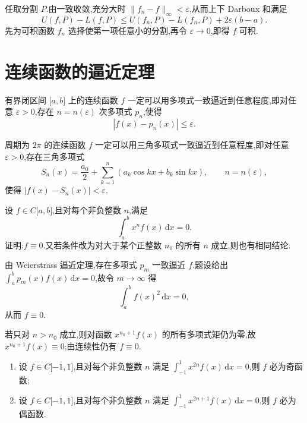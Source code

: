 \begin{solution}
    任取分割 $P$.由一致收敛,充分大时 $\|f_n-f\|_\infty<\varepsilon$,从而上下 Darboux 和满足
    \[
        U(f,P)-L(f,P)
        \leq U(f_n,P)-L(f_n,P)+2\varepsilon(b-a).
    \]
    先为可积函数 $f_n$ 选择使第一项任意小的分割,再令 $\varepsilon\to0$,即得 $f$ 可积.
\end{solution}


\newpage

\section{连续函数的逼近定理}

\begin{proposition}
    有界闭区间 $\lbrack a,b\rbrack$ 上的连续函数 $f$ 一定可以用多项式一致逼近到任意程度,即对任意 $\varepsilon>0$,存在 $n=n(\varepsilon)$ 次多项式 $p_n$,使得
    \[
        |f(x)-p_n(x)|\leq\varepsilon.
    \]
\end{proposition}

\begin{proposition}
    周期为 $2\pi$ 的连续函数 $f$ 一定可以用三角多项式一致逼近到任意程度,即对任意 $\varepsilon>0$,存在三角多项式
    \[
        S_n(x)=\dfrac{a_0}{2}+\sum\limits_{k=1}^{n}(a_k\cos kx+b_k\sin kx),
        \qquad n=n(\varepsilon),
    \]
    使得 $|f(x)-S_n(x)|<\varepsilon$.
\end{proposition}

\begin{example}
    设 $f\in C\lbrack a,b\rbrack$,且对每个非负整数 $n$,满足
    \[
        \int_a^bx^nf(x)\,\mathrm{d}x=0.
    \]
    证明:$f\equiv0$.又若条件改为对大于某个正整数 $n_0$ 的所有 $n$ 成立,则也有相同结论.
\end{example}
\exampleblank

\begin{solution}
    由 Weierstrass 逼近定理,存在多项式 $p_m$ 一致逼近 $f$.题设给出
    $\int_a^bp_m(x)f(x)\,\mathrm{d}x=0$,故令 $m\to\infty$ 得
    \[
        \int_a^bf(x)^2\,\mathrm{d}x=0,
    \]
    从而 $f\equiv0$.

    若只对 $n>n_0$ 成立,则对函数 $x^{n_0+1}f(x)$ 的所有多项式矩仍为零,故
    $x^{n_0+1}f(x)\equiv0$;由连续性仍有 $f\equiv0$.
\end{solution}

\begin{example}
    \begin{enumerate}
        \item 设 $f\in C\lbrack -1,1\rbrack$,且对每个非负整数 $n$ 满足 $\displaystyle\int_{-1}^{1}x^{2n}f(x)\,\mathrm{d}x=0$,则 $f$ 必为奇函数;
        \item 设 $f\in C\lbrack -1,1\rbrack$,且对每个非负整数 $n$ 满足 $\displaystyle\int_{-1}^{1}x^{2n+1}f(x)\,\mathrm{d}x=0$,则 $f$ 必为偶函数.
    \end{enumerate}
\end{example}
\exampleblank

